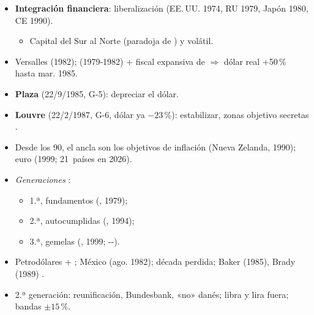 \documentclass{article}
\begin{document}
\begin{columnas}
\begin{itemize}
\item \textbf{Integración financiera}: liberalización (EE.\,UU. 1974, RU 1979, Japón 1980, CE 1990).
  \begin{itemize}
  \item Capital del Sur al Norte (paradoja de ) y volátil.
  \end{itemize}
\end{itemize}
\begin{itemize}
\item Versalles (1982);  (1979-1982) + fiscal expansiva de  $\Rightarrow$ dólar real +50\,\% hasta mar. 1985.
\item \textbf{Plaza} (22/9/1985, G-5): depreciar el dólar.
\item \textbf{Louvre} (22/2/1987, G-6, dólar ya $-23$\,\%): estabilizar, zonas objetivo secretas .
\item Desde los 90, el ancla son los objetivos de inflación (Nueva Zelanda, 1990); euro (1999; 21~países en 2026).
\end{itemize}
\begin{itemize}
\item \emph{Generaciones} :
  \begin{itemize}
  \item 1.ª, fundamentos (, 1979);
  \item 2.ª, autocumplidas (, 1994);
  \item 3.ª, gemelas (, 1999; --).
  \end{itemize}
\end{itemize}
\begin{itemize}
\item Petrodólares + ; México (ago. 1982); década perdida; Baker (1985), Brady (1989) .
\end{itemize}
\begin{itemize}
\item 2.ª generación: reunificación, Bundesbank, «no» danés; libra y lira fuera; bandas $\pm15$\,\%.

\end{itemize}
\end{columnas}
\end{document}
